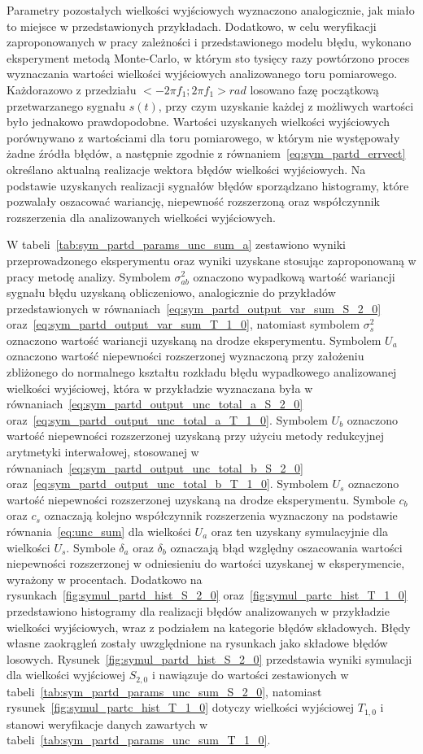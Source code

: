 Parametry pozostałych wielkości wyjściowych wyznaczono analogicznie, jak miało to miejsce w przedstawionych przykładach. Dodatkowo, w celu weryfikacji zaproponowanych w pracy zależności i przedstawionego modelu błędu, wykonano eksperyment metodą Monte-Carlo, w którym sto tysięcy razy powtórzono proces wyznaczania wartości wielkości wyjściowych analizowanego toru pomiarowego. Każdorazowo z przedziału $<-2 \pi f_{1};2 \pi f_{1}>\unit{rad}$ losowano fazę początkową przetwarzanego sygnału $s(t)$, przy czym uzyskanie każdej z możliwych wartości było jednakowo prawdopodobne. Wartości uzyskanych wielkości wyjściowych porównywano z wartościami dla toru pomiarowego, w którym nie występowały żadne źródła błędów, a następnie zgodnie z równaniem~\eqref{eq:sym_partd_errvect} określano aktualną realizacje wektora błędów wielkości wyjściowych. Na podstawie uzyskanych realizacji sygnałów błędów sporządzano histogramy, które pozwalały oszacować wariancję, niepewność rozszerzoną oraz współczynnik rozszerzenia dla analizowanych wielkości wyjściowych.

W tabeli~\ref{tab:sym_partd_params_unc_sum_a} zestawiono wyniki przeprowadzonego eksperymentu oraz wyniki uzyskane stosując zaproponowaną w pracy metodę analizy. Symbolem $\sigma_{ab}^{2}$ oznaczono wypadkową wartość wariancji sygnału błędu uzyskaną obliczeniowo, analogicznie do przykładów przedstawionych w równaniach~\eqref{eq:sym_partd_output_var_sum_S_2_0} oraz~\eqref{eq:sym_partd_output_var_sum_T_1_0}, natomiast symbolem $\sigma_{s}^{2}$ oznaczono wartość wariancji uzyskaną na drodze eksperymentu. Symbolem $U_{a}$ oznaczono wartość niepewności rozszerzonej wyznaczoną przy założeniu zbliżonego do normalnego kształtu rozkładu błędu wypadkowego analizowanej wielkości wyjściowej, która w przykładzie wyznaczana była w równaniach~\eqref{eq:sym_partd_output_unc_total_a_S_2_0} oraz~\eqref{eq:sym_partd_output_unc_total_a_T_1_0}. Symbolem $U_{b}$ oznaczono wartość niepewności rozszerzonej uzyskaną przy użyciu metody redukcyjnej arytmetyki interwałowej, stosowanej w równaniach~\eqref{eq:sym_partd_output_unc_total_b_S_2_0} oraz~\eqref{eq:sym_partd_output_unc_total_b_T_1_0}. Symbolem $U_{s}$ oznaczono wartość niepewności rozszerzonej uzyskaną na drodze eksperymentu. Symbole $c_{b}$ oraz $c_{s}$ oznaczają kolejno współczynnik rozszerzenia wyznaczony na podstawie równania~\eqref{eq:unc_sum} dla wielkości $U_{a}$ oraz ten uzyskany symulacyjnie dla wielkości $U_{s}$. Symbole $\delta_{a}$ oraz $\delta_{b}$ oznaczają błąd względny oszacowania wartości niepewności rozszerzonej w odniesieniu do wartości uzyskanej w eksperymencie, wyrażony w procentach. Dodatkowo na rysunkach~\ref{fig:symul_partd_hist_S_2_0} oraz~\ref{fig:symul_partc_hist_T_1_0} przedstawiono histogramy dla realizacji błędów analizowanych w przykładzie wielkości wyjściowych, wraz z podziałem na kategorie błędów składowych. Błędy własne zaokrągleń zostały uwzględnione na rysunkach jako składowe błędów losowych. Rysunek~\ref{fig:symul_partd_hist_S_2_0} przedstawia wyniki symulacji dla wielkości wyjściowej $S_{2,0}$ i nawiązuje do wartości zestawionych w tabeli~\ref{tab:sym_partd_params_unc_sum_S_2_0}, natomiast rysunek~\ref{fig:symul_partc_hist_T_1_0} dotyczy wielkości wyjściowej $T_{1,0}$ i stanowi weryfikacje danych zawartych w tabeli~\ref{tab:sym_partd_params_unc_sum_T_1_0}.


